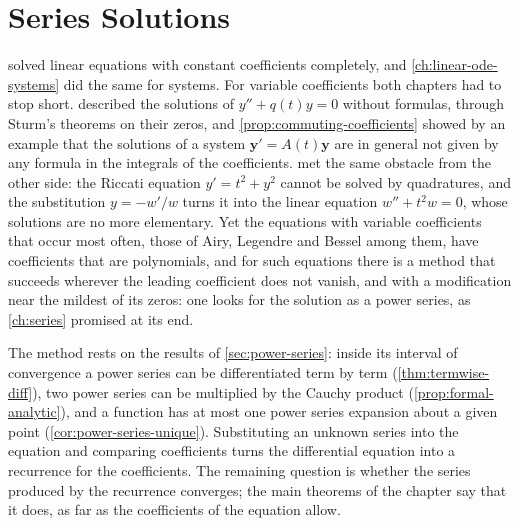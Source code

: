 \chapter{Series Solutions}
\label{ch:series-solutions}


 solved linear equations with constant coefficients completely, and \cref{ch:linear-ode-systems} did the same for systems. For variable coefficients both chapters had to stop short.  described the solutions of $y''+q(t)y=0$ without formulas, through Sturm's theorems on their zeros, and \cref{prop:commuting-coefficients} showed by an example that the solutions of a system $\mathbf y'=A(t)\mathbf y$ are in general not given by any formula in the integrals of the coefficients.  met the same obstacle from the other side: the Riccati equation $y'=t^2+y^2$ cannot be solved by quadratures, and the substitution $y=-w'/w$ turns it into the linear equation $w''+t^2w=0$, whose solutions are no more elementary. Yet the equations with variable coefficients that occur most often, those of Airy, Legendre and Bessel among them, have coefficients that are polynomials, and for such equations there is a method that succeeds wherever the leading coefficient does not vanish, and with a modification near the mildest of its zeros: one looks for the solution as a power series, as \cref{ch:series} promised at its end.

The method rests on the results of \cref{sec:power-series}: inside its interval of convergence a power series can be differentiated term by term (\cref{thm:termwise-diff}), two power series can be multiplied by the Cauchy product (\cref{prop:formal-analytic}), and a function has at most one power series expansion about a given point (\cref{cor:power-series-unique}). Substituting an unknown series into the equation and comparing coefficients turns the differential equation into a recurrence for the coefficients. The remaining question is whether the series produced by the recurrence converges; the main theorems of the chapter say that it does, as far as the coefficients of the equation allow.

